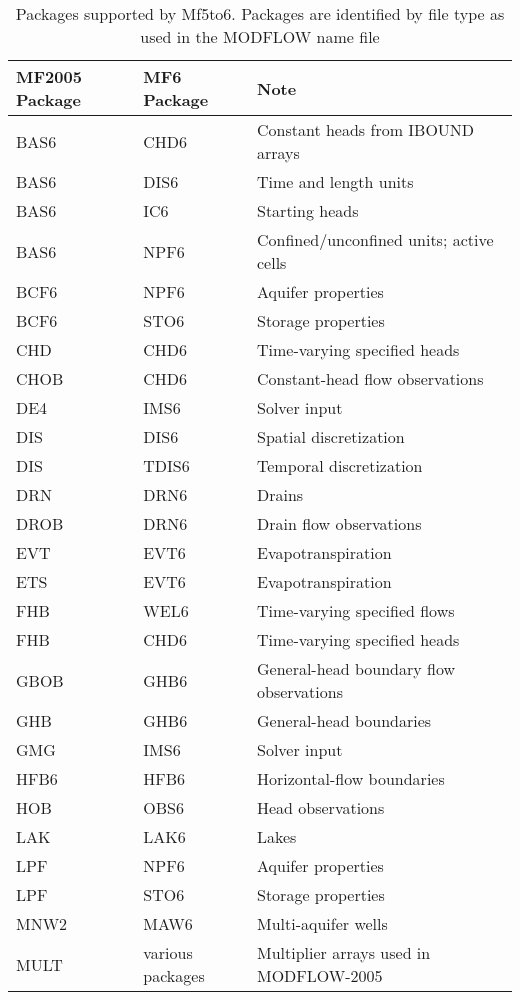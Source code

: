 \documentclass[11pt,twoside,twocolumn]{usgsreport}
\newcommand{\programname}{Mf5to6}
\begin{document}

\begin{table}[ht]
\caption{Packages supported by \programname{}. Packages are identified by file type as used in the MODFLOW name file}
\small
\begin{tabular*}{\columnwidth}{l l l}
\hline
\hline
MF2005 Package & MF6 Package & Note \\
\hline
BAS6 & CHD6 & Constant heads from IBOUND arrays \\
BAS6 & DIS6 & Time and length units  \\
BAS6 & IC6 & Starting heads \\
BAS6 & NPF6 & Confined/unconfined units; active cells \\
BCF6 & NPF6 & Aquifer properties \\
BCF6 & STO6 & Storage properties  \\
CHD & CHD6 & Time-varying specified heads \\
CHOB & CHD6 & Constant-head flow observations \\
DE4 & IMS6 & Solver input \\
DIS & DIS6 & Spatial discretization \\
DIS & TDIS6 & Temporal discretization  \\
DRN & DRN6 & Drains  \\
DROB & DRN6 & Drain flow observations  \\
EVT & EVT6 & Evapotranspiration \\
ETS & EVT6 & Evapotranspiration \\
FHB & WEL6 & Time-varying specified flows \\
FHB & CHD6 & Time-varying specified heads \\
GBOB & GHB6 & General-head boundary flow observations \\
GHB & GHB6 & General-head boundaries \\
GMG & IMS6 & Solver input \\
HFB6 & HFB6 & Horizontal-flow boundaries \\
HOB & OBS6 & Head observations \\
LAK & LAK6 & Lakes \\
LPF & NPF6 & Aquifer properties \\
LPF & STO6 & Storage properties \\
MNW2 & MAW6 & Multi-aquifer wells  \\
MULT & various packages & Multiplier arrays used in MODFLOW-2005  \\

\end{tabular*}
\end{table}
\end{document}
